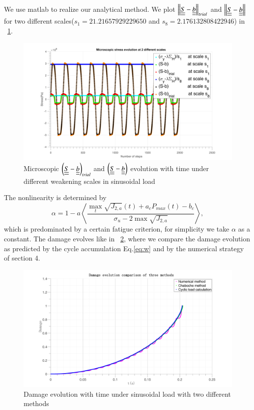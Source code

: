 \documentclass[3p,times,number,review]{elsarticle}
\newcommand{\figref}[1]{\figurename~\ref{#1}}
\begin{document}
We use matlab to realize our analytical method. We plot $\left\|  \uline{\uline{S}}-\uline{\uline{b}}\right\|_{trial}$ and $\left\|  \uline{\uline{S}}-\uline{\uline{b}}\right\|$ for two different scales($s_1=21.21657929229650$ and $s_8=2.176132808422946$) in \figref{trialsin}.
\begin{figure}[!h]
	\centering
	\includegraphics[width=\textwidth]{figures//trialsin.png} 
	\caption{Microscopic $\left(  \uline{\uline{S}}-\uline{\uline{b}}\right)_{trial}$ and $\left( \uline{\uline{S}}-\uline{\uline{b}}\right)$ evolution with time under different weakening scales in sinusoidal load}
	\label{trialsin}
\end{figure}

The nonlinearity is determined by 
$$\alpha=1 - a\left\langle \dfrac{\max\limits_{t}\sqrt{J_{2,a}}(t)+a_c{P_{max}(t)}-b_c}{ \sigma_{u} - 2\max\sqrt{J_{2,a}}}\right\rangle,$$ 
 which is predominated by a certain fatigue criterion, for simplicity we take $\alpha$ as a constant. The damage evolves like in \figref{damsin}, where we compare the damage evolution as predicted by the cycle accumulation Eq.\eqref{eq:w} and by the numerical strategy of section 4.

\begin{figure}[!h]
	\centering
	\includegraphics[width=\textwidth]{figures//damagesin.png} 
	\caption{Damage evolution with time under sinusoidal load with two different methods}
	\label{damsin}
\end{figure}
\end{document}
